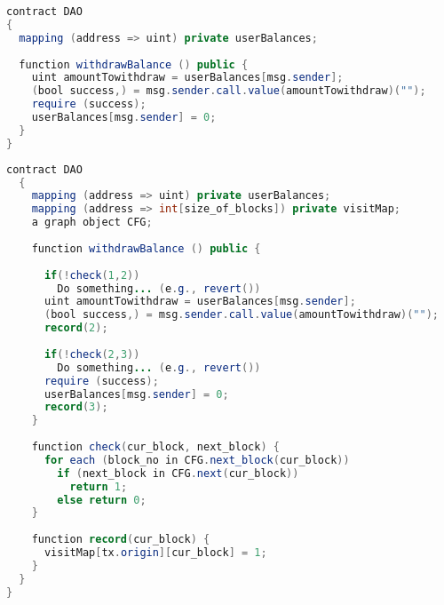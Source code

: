 \documentclass{article}
\begin{document}
\begin{lstlisting}[language=Java, frame=single, caption={Problematic Contract}, captionpos = b]
contract DAO
{
  mapping (address => uint) private userBalances;
  
  function withdrawBalance () public {
    uint amountTowithdraw = userBalances[msg.sender];
    (bool success,) = msg.sender.call.value(amountTowithdraw)("");
    require (success);
    userBalances[msg.sender] = 0;
  }
}
\end{lstlisting}

\newpage

\begin{lstlisting}[language=Java, frame=single, caption={Instrumented Contract}, captionpos = b]
  contract DAO
  {
    mapping (address => uint) private userBalances;
    mapping (address => int[size_of_blocks]) private visitMap;
    a graph object CFG;
  
    function withdrawBalance () public {
      
      if(!check(1,2))
        Do something... (e.g., revert()) 
      uint amountTowithdraw = userBalances[msg.sender];
      (bool success,) = msg.sender.call.value(amountTowithdraw)("");
      record(2);
  
      if(!check(2,3))
        Do something... (e.g., revert())
      require (success);
      userBalances[msg.sender] = 0;
      record(3);
    }
  
    function check(cur_block, next_block) {
      for each (block_no in CFG.next_block(cur_block))
        if (next_block in CFG.next(cur_block))
          return 1;
        else return 0;
    }
  
    function record(cur_block) {
      visitMap[tx.origin][cur_block] = 1;
    }
  }
}
\end{lstlisting}
\end{document}
